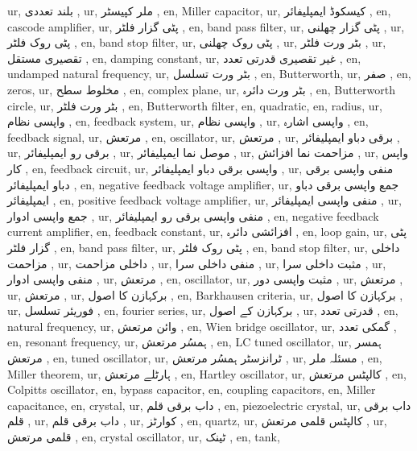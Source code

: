 ur, بلند تعددی ,
ur, ملر کپیسٹر ,
en, Miller capacitor,
ur, کیسکوڈ ایمپلیفائر ,
en, cascode amplifier,
ur, پٹی گزار فلٹر ,
en, band pass filter,
ur, پٹی گزار چھلنی ,
ur, پٹی روک فلٹر ,
en, band stop filter,
ur, پٹی روک چھلنی ,
ur, بٹر ورت فلٹر ,
ur, تقصیری مستقل ,
en, damping constant,
ur, غیر تقصیری قدرتی تعدد ,
en, undamped natural frequency,
ur, بٹر ورت تسلسل ,
en, Butterworth,
ur, صفر ,
en, zeros,
ur, مخلوط سطح ,
en, complex plane,
ur, بٹر ورت دائرہ ,
en, Butterworth circle,
ur, بٹر ورت فلٹر ,
en, Butterworth filter,
en, quadratic,
en, radius,
ur, واپسی نظام ,
en, feedback system,
ur, واپسی نظام ,
ur, واپسی اشارہ ,
en, feedback signal,
ur, مرتعش ,
en, oscillator,
ur, مرتعش ,
ur, برقی دباو ایمپلیفائر ,
ur, برقی رو ایمپلیفائر ,
ur, موصل نما ایمپلیفائر ,
ur, مزاحمت نما افزائش ,
ur, واپس کار ,
en, feedback circuit,
ur, واپسی برقی دباو ایمپلیفائر ,
ur, منفی واپسی برقی دباو ایمپلیفائر ,
en, negative feedback voltage amplifier,
ur, جمع واپسی برقی دباو ایمپلیفائر ,
en, positive feedback voltage amplifier,
ur, منفی واپسی ایمپلیفائر ,
ur, جمع واپسی ادوار ,
ur, منفی واپسی برقی رو ایمپلیفائر ,
en, negative feedback current amplifier,
en, feedback constant,
ur, افزائشی دائرہ ,
en, loop gain,
ur, پٹی گزار فلٹر ,
en, band pass filter,
ur, پٹی روک فلٹر ,
en, band stop filter,
ur, داخلی مزاحمت ,
ur, داخلی مزاحمت ,
ur, منفی داخلی سرا ,
ur, مثبت داخلی سرا ,
ur, منفی واپسی ادوار ,
ur, مرتعش ,
en, oscillator,
ur, مثبت واپسی دور ,
ur, مرتعش ,
ur, مرتعش ,
ur, برکہازن کا اصول ,
en, Barkhausen criteria,
ur, برکہازن کا اصول ,
ur, فوریئر تسلسل ,
en, fourier series,
ur, برکہازن کے اصول ,
ur, قدرتی تعدد ,
en, natural frequency,
ur, وائن مرتعش ,
en, Wien bridge oscillator,
ur, گمکی تعدد ,
en, resonant frequency,
ur, ہمسُر مرتعش ,
en, LC tuned oscillator,
ur, ہمسر مرتعش ,
en, tuned oscillator,
ur, ٹرانزسٹر ہمسُر مرتعش ,
ur, مسئلہ ملر ,
en, Miller theorem,
ur, ہارٹلے مرتعش ,
en, Hartley oscillator,
ur, کالپٹس مرتعش ,
en, Colpitts oscillator,
en, bypass capacitor,
en, coupling capacitors,
en, Miller capacitance,
en, crystal,
ur, داب برقی قلم ,
en, piezoelectric crystal,
ur, داب برقی قلم ,
ur, داب برقی قلم ,
ur, کوارٹز ,
en, quartz,
ur, کالپٹس قلمی مرتعش ,
ur, قلمی مرتعش ,
en, crystal oscillator,
ur, ٹینک ,
en, tank,

